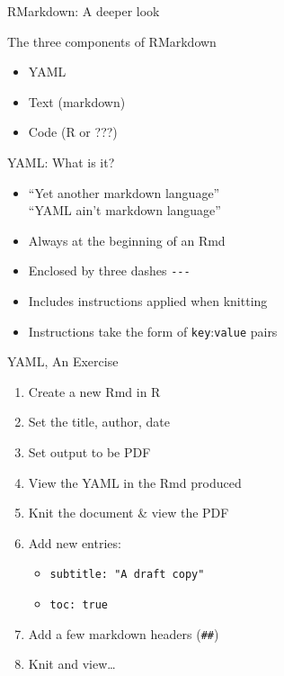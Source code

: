 \documentclass[
  ignorenonframetext,
]{beamer}
\providecommand{\tightlist}{%
  \setlength{\itemsep}{0pt}\setlength{\parskip}{0pt}}
\begin{document}
\begin{frame}{RMarkdown: A deeper look}
\protect\hypertarget{rmarkdown-a-deeper-look}{}
\begin{block}{The three components of RMarkdown}
\protect\hypertarget{the-three-components-of-rmarkdown}{}
\begin{itemize}
\tightlist
\item
  YAML
\item
  Text (markdown)
\item
  Code (R or ???)
\end{itemize}
\end{block}
\end{frame}

\begin{frame}[fragile]{YAML: What is it?}
\protect\hypertarget{yaml-what-is-it}{}
\begin{itemize}
\tightlist
\item
  ``Yet another markdown language''\\
  ``YAML ain't markdown language''
\item
  Always at the beginning of an Rmd
\item
  Enclosed by three dashes \texttt{-\/-\/-}
\item
  Includes instructions applied when knitting
\item
  Instructions take the form of \texttt{key}:\texttt{value} pairs
\end{itemize}
\end{frame}

\begin{frame}[fragile]{YAML, An Exercise}
\protect\hypertarget{yaml-an-exercise}{}
\begin{enumerate}
\tightlist
\item
  Create a new Rmd in R
\item
  Set the title, author, date
\item
  Set output to be PDF
\item
  View the YAML in the Rmd produced
\item
  Knit the document \& view the PDF
\item
  Add new entries:

  \begin{itemize}
  \tightlist
  \item
    \texttt{subtitle:\ "A\ draft\ copy"}
  \item
    \texttt{toc:\ true}
  \end{itemize}
\item
  Add a few markdown headers (\texttt{\#\#})
\item
  Knit and view\ldots{}
\end{enumerate}
\end{frame}
\end{document}
